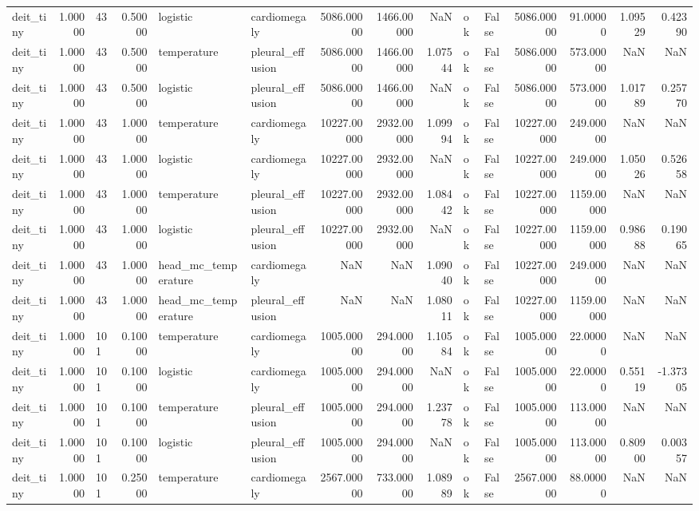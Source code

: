 \begin{tabular}{lrlrllrrrllrrrr}
deit\_tiny & 1.00000 & 43 & 0.50000 & logistic & cardiomegaly & 5086.00000 & 1466.00000 & NaN & ok & False & 5086.00000 & 91.00000 & 1.09529 & 0.42390 \\
deit\_tiny & 1.00000 & 43 & 0.50000 & temperature & pleural\_effusion & 5086.00000 & 1466.00000 & 1.07544 & ok & False & 5086.00000 & 573.00000 & NaN & NaN \\
deit\_tiny & 1.00000 & 43 & 0.50000 & logistic & pleural\_effusion & 5086.00000 & 1466.00000 & NaN & ok & False & 5086.00000 & 573.00000 & 1.01789 & 0.25770 \\
deit\_tiny & 1.00000 & 43 & 1.00000 & temperature & cardiomegaly & 10227.00000 & 2932.00000 & 1.09994 & ok & False & 10227.00000 & 249.00000 & NaN & NaN \\
deit\_tiny & 1.00000 & 43 & 1.00000 & logistic & cardiomegaly & 10227.00000 & 2932.00000 & NaN & ok & False & 10227.00000 & 249.00000 & 1.05026 & 0.52658 \\
deit\_tiny & 1.00000 & 43 & 1.00000 & temperature & pleural\_effusion & 10227.00000 & 2932.00000 & 1.08442 & ok & False & 10227.00000 & 1159.00000 & NaN & NaN \\
deit\_tiny & 1.00000 & 43 & 1.00000 & logistic & pleural\_effusion & 10227.00000 & 2932.00000 & NaN & ok & False & 10227.00000 & 1159.00000 & 0.98688 & 0.19065 \\
deit\_tiny & 1.00000 & 43 & 1.00000 & head\_mc\_temperature & cardiomegaly & NaN & NaN & 1.09040 & ok & False & 10227.00000 & 249.00000 & NaN & NaN \\
deit\_tiny & 1.00000 & 43 & 1.00000 & head\_mc\_temperature & pleural\_effusion & NaN & NaN & 1.08011 & ok & False & 10227.00000 & 1159.00000 & NaN & NaN \\
deit\_tiny & 1.00000 & 101 & 0.10000 & temperature & cardiomegaly & 1005.00000 & 294.00000 & 1.10584 & ok & False & 1005.00000 & 22.00000 & NaN & NaN \\
deit\_tiny & 1.00000 & 101 & 0.10000 & logistic & cardiomegaly & 1005.00000 & 294.00000 & NaN & ok & False & 1005.00000 & 22.00000 & 0.55119 & -1.37305 \\
deit\_tiny & 1.00000 & 101 & 0.10000 & temperature & pleural\_effusion & 1005.00000 & 294.00000 & 1.23778 & ok & False & 1005.00000 & 113.00000 & NaN & NaN \\
deit\_tiny & 1.00000 & 101 & 0.10000 & logistic & pleural\_effusion & 1005.00000 & 294.00000 & NaN & ok & False & 1005.00000 & 113.00000 & 0.80900 & 0.00357 \\
deit\_tiny & 1.00000 & 101 & 0.25000 & temperature & cardiomegaly & 2567.00000 & 733.00000 & 1.08989 & ok & False & 2567.00000 & 88.00000 & NaN & NaN \\

\end{tabular}
